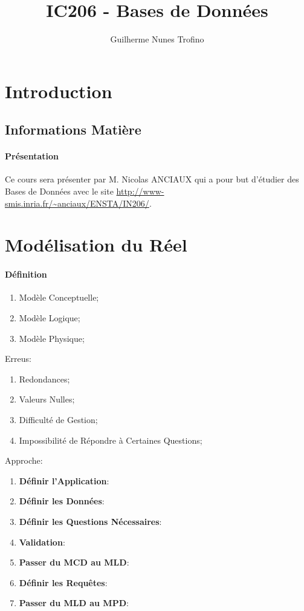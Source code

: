 \documentclass{article}
\title{IC206 - Bases de Données}
\author{Guilherme Nunes Trofino}
\begin{document}
\maketitle

\newpage\tableofcontents

\section{Introduction}



\subsection{Informations Matière}
\paragraph{Présentation}Ce cours sera présenter par M. Nicolas ANCIAUX qui a pour but d'étudier des Bases de Données avec le site \url{http://www-smis.inria.fr/~anciaux/ENSTA/IN206/}.

\section{Modélisation du Réel}
\paragraph{Définition}
\begin{enumerate}[noitemsep]
    \item Modèle Conceptuelle;
    \item Modèle Logique;
    \item Modèle Physique;
\end{enumerate}
Erreus:
\begin{enumerate}[noitemsep]
    \item Redondances;
    \item Valeurs Nulles;
    \item Difficulté de Gestion;
    \item Impossibilité de Répondre à Certaines Questions;
\end{enumerate}
Approche:
\begin{enumerate}
    \item \textbf{Définir l'Application}:
    \item \textbf{Définir les Données}:
    \item \textbf{Définir les Questions Nécessaires}:
    \item \textbf{Validation}:
    \item \textbf{Passer du MCD au MLD}:
    \item \textbf{Définir les Requêtes}:
    \item \textbf{Passer du MLD au MPD}:
\end{enumerate}
\end{document}
